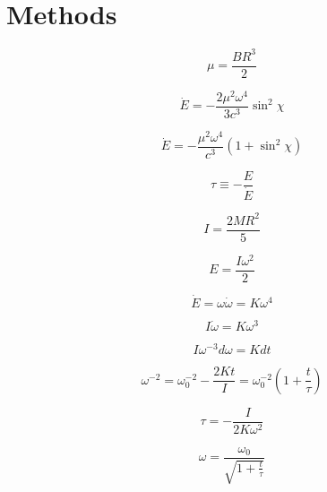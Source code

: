 \chapter{Methods}
\label{ch:methods}

\begin{equation}
	\mu = \frac{BR^3}{2}
\end{equation}

\begin{equation}
	\dot{E} = -\frac{2\mu^2\omega^4}{3c^3} \sin^2 \!\chi
\end{equation}

\begin{equation}
	\dot{E} = -\frac{\mu^2\omega^4}{c^3} \left(1 + \sin^2 \!\chi \right)
\end{equation}

\begin{equation}
	\tau \equiv -\frac{E}{\dot{E}}
\end{equation}

\begin{equation}
	I = \frac{2 M R^2}{5}
\end{equation}

\begin{equation}
	E = \frac{I\omega^2}{2}
\end{equation}

\begin{equation}
	\dot{E} = \omega\dot{\omega} = K \omega^4
\end{equation}

\begin{equation}
	I\dot{\omega} = K \omega^3
\end{equation}

\begin{equation}
	I \omega^{-3} d\omega = K dt
\end{equation}

\begin{equation}
	\omega^{-2} = \omega_0^{-2} - \frac{2Kt}{I} = \omega_0^{-2} \left( 1 + \frac{t}{\tau} \right)
\end{equation}

\begin{equation}
	\tau = - \frac{I}{2K\omega^2}
\end{equation}

\begin{equation}
	\omega = \frac{\omega_0}{\sqrt{1 + \frac{t}{\tau}}}
\end{equation}


